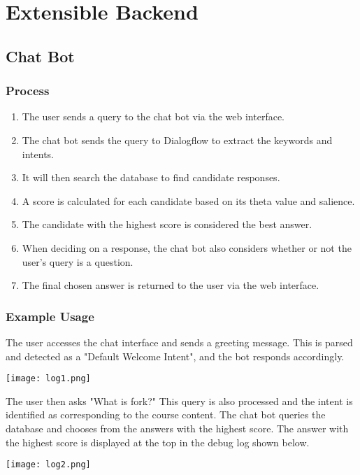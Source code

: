 \section{Extensible Backend}
\subsection{Chat Bot}
\subsubsection{Process}
\begin{enumerate}
    \item{The user sends a query to the chat bot via the web interface.}
    \item{The chat bot sends the query to Dialogflow to extract the keywords and intents.}
    \item{It will then search the database to find candidate responses.}
    \item{A score is calculated for each candidate based on its theta value and salience.}
    \item{The candidate with the highest score is considered the best answer.}
    \item{When deciding on a response, the chat bot also considers whether or not the user's query is a question.}
    \item{The final chosen answer is returned to the user via the web interface.}
\end{enumerate}

\subsubsection{Example Usage}
The user accesses the chat interface and sends a greeting message. This is parsed and detected as a "Default Welcome Intent", and the bot responds accordingly.

\begin{center}
    \texttt{[image: log1.png]}
\end{center}

The user then asks "What is fork?" This query is also processed and the intent is identified as corresponding to the course content. The chat bot queries the database and chooses from the answers with the highest score. The answer with the highest score is displayed at the top in the debug log shown below.

\begin{center}
    \texttt{[image: log2.png]}
\end{center}

